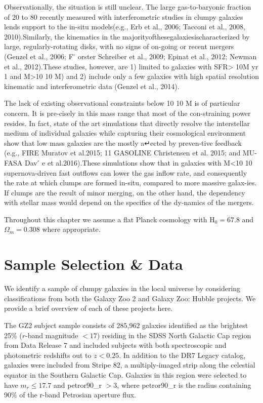 Observationally, the situation is still unclear. The large gas-to-baryonic fraction of 20 to 80 recently measured with interferometric studies in clumpy galaxies lends support to the in-situ models(e.g., Erb et al., 2006; Tacconi et al., 2008, 2010).Similarly, the kinematics in the majorityofthesegalaxiesischaracterized by large, regularly-rotating disks, with no signs of on-going or recent mergers (Genzel et al., 2006; F ̈ orster Schreiber et al., 2009; Epinat et al., 2012; Newman et al., 2012).These studies, however, are 1) limited to galaxies with SFR> 10M yr 1 and M>10 10 M) and 2) include only a few galaxies with high spatial resolution kinematic and interferometric data (Genzel et al., 2014). 

The lack of existing observational constraints below 10 10 M is of particular concern. It is pre-cisely in this mass range that most of the con-straining power resides. In fact, state of the art simulations that directly resolve the interstellar medium of individual galaxies while capturing their cosmological environment show that low mass galaxies are the mostly a↵ected by preven-tive feedback (e.g., FIRE Muratov et al.2015; 11
GASOLINE Christensen et al. 2015; and MU-FASA Dav ́ e et al.2016).These simulations show that in galaxies with M<10 10 supernova-driven fast outflows can lower the gas inflow rate, and consequently the rate at which clumps are formed in-situ, compared to more massive galax-ies. If clumps are the result of minor merging, on the other hand, the dependency with stellar mass would depend on the specifics of the dy-namics of the mergers. 

Throughout this chapter we assume a flat Planck cosmology with H$_0=67.8$ and $\Omega_m = 0.308$ where appropriate. 


\section{Sample Selection \& Data} \label{sec:chap5-sample}

We identify a sample of clumpy galaxies in the local universe by considering classifications from both the Galaxy Zoo 2 \citep[GZ2][]{Willett2013} and Galaxy Zoo: Hubble \citep[GZH][]{Willett2017} projects. We provide a brief overview of each of these projects here. 

The GZ2 subject sample consists of 285,962 galaxies identified as the brightest 25\% ($r$-band magnitude $< 17$) residing in the SDSS North Galactic Cap region from Data Release 7 and included subjects with both spectroscopic and photometric redshifts out to $z < 0.25$. In addition to the DR7 Legacy catalog, galaxies were included from Stripe 82, a multiply-imaged strip along the celestial equator in the Southern Galactic Cap. Galaxies in this region were selected to have $m_r\le17.7$ and petror90\_r $>3$, where petror90\_r is the radius containing 90\% of the r-band Petrosian aperture flux.


